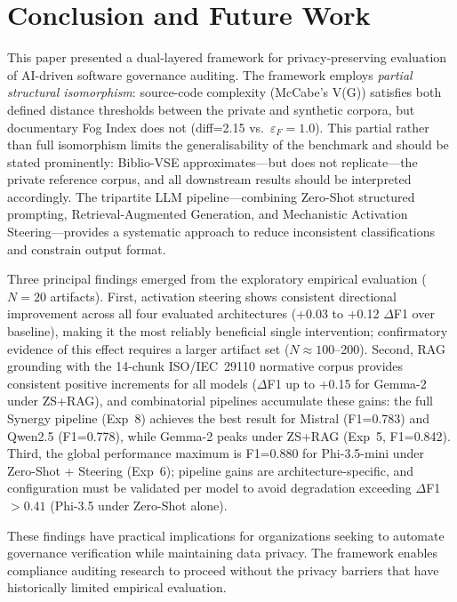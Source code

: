 \documentclass{ieeeaccess}
\begin{document}
\section{Conclusion and Future Work}
\label{sec:conclusion}

This paper presented a dual-layered framework for privacy-preserving evaluation of AI-driven software governance auditing. The framework employs \emph{partial structural isomorphism}: source-code complexity (McCabe's V(G)) satisfies both defined distance thresholds between the private and synthetic corpora, but documentary Fog Index does not (diff=2.15 vs.\ $\varepsilon_F=1.0$). This partial rather than full isomorphism limits the generalisability of the benchmark and should be stated prominently: Biblio-VSE approximates---but does not replicate---the private reference corpus, and all downstream results should be interpreted accordingly. The tripartite LLM pipeline---combining Zero-Shot structured prompting, Retrieval-Augmented Generation, and Mechanistic Activation Steering---provides a systematic approach to reduce inconsistent classifications and constrain output format.

Three principal findings emerged from the exploratory empirical evaluation ($N=20$ artifacts). First, activation steering shows consistent directional improvement across all four evaluated architectures (+0.03 to +0.12 $\Delta$F1 over baseline), making it the most reliably beneficial single intervention; confirmatory evidence of this effect requires a larger artifact set ($N \approx 100$--200). Second, RAG grounding with the 14-chunk ISO/IEC~29110 normative corpus provides consistent positive increments for all models ($\Delta$F1 up to +0.15 for Gemma-2 under ZS+RAG), and combinatorial pipelines accumulate these gains: the full Synergy pipeline (Exp~8) achieves the best result for Mistral (F1=0.783) and Qwen2.5 (F1=0.778), while Gemma-2 peaks under ZS+RAG (Exp~5, F1=0.842). Third, the global performance maximum is F1=0.880 for Phi-3.5-mini under Zero-Shot + Steering (Exp~6); pipeline gains are architecture-specific, and configuration must be validated per model to avoid degradation exceeding $\Delta$F1 $> 0.41$ (Phi-3.5 under Zero-Shot alone).

These findings have practical implications for organizations seeking to automate governance verification while maintaining data privacy. The framework enables compliance auditing research to proceed without the privacy barriers that have historically limited empirical evaluation.
\end{document}
